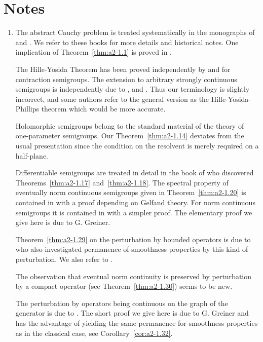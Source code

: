\section*{Notes}\label{notes:a2-notes}
\begin{enumerate}[label=\emph{Section 2.\arabic*:}, wide, itemsep=1ex]
\item
The abstract Cauchy problem is treated systematically in the monographs of \textcite{krein:1971} and \textcite{fattorini:1983}.
We refer to these books for more details and historical notes.
One implication of Theorem~\ref{thm:a2-1.1}   is proved in \textcite[Theorem 2.11]{krein:1971}.

The Hille-Yosida Theorem has been proved independently by \textcite{hille:1948} and \textcite{yosida:1948} for contraction semigroups.
The extension to arbitrary strongly continuous semigroups is independently due to \textcite{feller:1953a}, \textcite{miyadera:1952} and \textcite{phillips:1954}.
Thus our terminology is slightly incorrect, and some authors refer to the general version as the Hille-Yosida-Phillips theorem which would be more accurate. %

Holomorphic semigroups belong to the standard material of the theory of one-parameter semigroups.
Our Theorem~\ref{thm:a2-1.14}   deviates from the usual presentation since the condition on the resolvent is merely required on a half-plane.

Differentiable semigroups are treated in detail in the book of \textcite{pazy:1983} who discovered Theorems~\ref{thm:a2-1.17}   and~\ref{thm:a2-1.18}. 
The spectral property of eventually norm continuous semigroups given in Theorem~\ref{thm:a2-1.20}   is contained in \textcite[Theorem 16.4.2]{hillephillips:1957} with a proof depending on Gelfand theory.
For norm continuous semigroups it is contained in \textcite{pazy:1983} with a simpler proof.
The elementary proof we give here is due to G. Greiner.

Theorem~\ref{thm:a2-1.29}   on the perturbation by bounded operators is due to \textcite{phillips:1954} who also investigated permanence of smoothness properties by this kind of perturbation.
We also refer to \textcite[Section 3.1]{pazy:1983}.

The observation that eventual norm continuity is preserved by perturbation by a compact operator (see Theorem~\ref{thm:a2-1.30}) seems to be new.

The perturbation by operators being continuous on the graph of the generator is due to \textcite{deschschappacher:1984}.
The short proof we give here is due to G. Greiner and has the advantage of yielding the same permanence for smoothness properties as in the classical case, see Corollary~\ref{cor:a2-1.32}. 


\end{enumerate}
